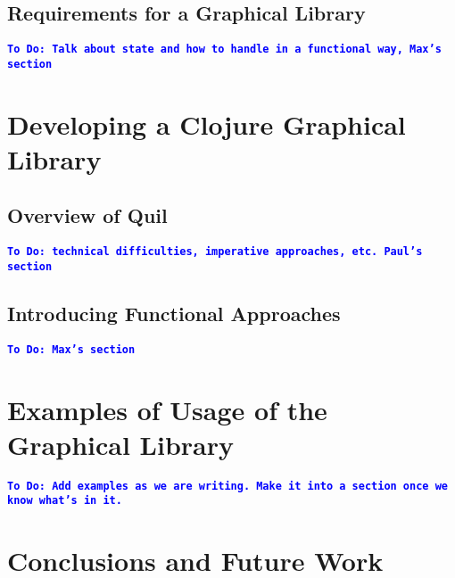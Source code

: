 \documentclass[12pt]{article}
\newcommand{\comment}[1]{{\bf \tt  {#1}}}
\newcommand{\todo}[1]{\textcolor{blue}{\comment{To Do: {#1}}}}
\begin{document}
\subsection{Requirements for a Graphical Library}\label{subsec:requirements}
\todo{Talk about state and how to handle in a functional way, Max's section}

\section{Developing a Clojure Graphical Library}\label{sec:library}

\subsection{Overview of Quil}\label{subsec:quil}
\todo{technical difficulties, imperative approaches, etc. Paul's section}

\subsection{Introducing Functional Approaches}\label{subsec:functional}
\todo{Max's section}

\section{Examples of Usage of the Graphical Library}\label{sec:usage}
\todo{Add examples as we are writing. Make it into a section once we know what's in it.}

\section{Conclusions and Future Work}\label{sec:future-work}


%
%

%  
%
%




\end{document}

